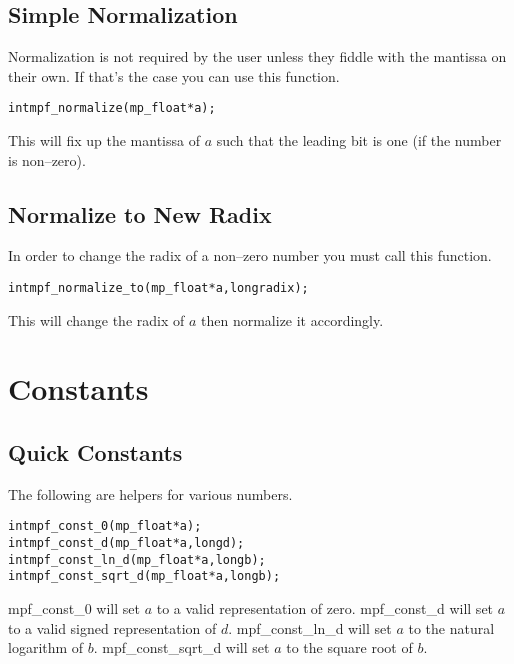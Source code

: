 \documentclass[b5paper]{book}
\begin{document}
\subsection{Simple Normalization}
Normalization is not required by the user unless they fiddle with the mantissa on their own.  If that's the case you can
use this function.
\begin{alltt}
int  mpf_normalize(mp_float *a);
\end{alltt}
This will fix up the mantissa of $a$ such that the leading bit is one (if the number is non--zero).  

\subsection{Normalize to New Radix}
In order to change the radix of a non--zero number you must call this function.

\begin{alltt}
int  mpf_normalize_to(mp_float *a, long radix);
\end{alltt}
This will change the radix of $a$ then normalize it accordingly.

\section{Constants}

\subsection{Quick Constants}
The following are helpers for various numbers.

   
\begin{alltt}
int  mpf_const_0(mp_float *a);
int  mpf_const_d(mp_float *a, long d);
int  mpf_const_ln_d(mp_float *a, long b);
int  mpf_const_sqrt_d(mp_float *a, long b);
\end{alltt}

mpf\_const\_0 will set $a$ to a valid representation of zero.  mpf\_const\_d will set $a$ to a valid signed representation of 
$d$.  mpf\_const\_ln\_d will set $a$ to the natural logarithm of $b$.  mpf\_const\_sqrt\_d will set $a$ to the square root of
$b$.
\end{document}
